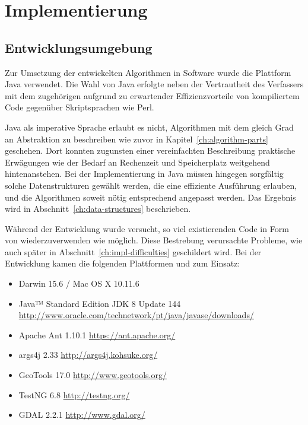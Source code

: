 \documentclass[../main/thesis.tex]{subfiles}
\begin{document}
\chapter{Implementierung}

\section{Entwicklungsumgebung}

Zur Umsetzung der entwickelten Algorithmen in Software wurde die Plattform Java verwendet.
Die Wahl von Java erfolgte neben der Vertrautheit des Verfassers mit dem zugehörigen  aufgrund zu erwartender Effizienzvorteile von kompiliertem Code gegenüber Skriptsprachen wie Perl.

Java als imperative Sprache erlaubt es nicht, Algorithmen mit dem gleich Grad an Abstraktion zu beschreiben wie zuvor in Kapitel~\ref{ch:algorithm-parts} geschehen.
Dort konnten zugunsten einer vereinfachten
Beschreibung praktische Erwägungen wie der Bedarf an Rechenzeit und Speicherplatz weitgehend hintenanstehen.
Bei der Implementierung in Java müssen hingegen sorgfältig solche Datenstrukturen gewählt werden, die eine effiziente Ausführung erlauben, und die Algorithmen soweit nötig entsprechend angepasst werden.
Das Ergebnis wird in Abschnitt~\ref{ch:data-structures} beschrieben.

Während der Entwicklung wurde versucht, so viel existierenden Code in Form von  wiederzuverwenden wie möglich.
Diese Bestrebung verursachte Probleme, wie auch später in Abschnitt~\ref{ch:impl-difficulties} geschildert wird.
Bei der Entwicklung kamen die folgenden Plattformen und  zum Einsatz:

\begin{itemize}[nosep]
	\item Darwin 15.6 / Mac OS X 10.11.6
	\item Java™ Standard Edition JDK 8 Update 144\\ \url{http://www.oracle.com/technetwork/pt/java/javase/downloads/}
	\item Apache Ant 1.10.1 \quad \url{https://ant.apache.org/}
	\item args4j 2.33 \quad \url{http://args4j.kohsuke.org/}
	\item GeoTools 17.0 \quad \url{http://www.geotools.org/}
	\item TestNG 6.8 \quad \url{http://testng.org/}
	\item GDAL 2.2.1 \quad \url{http://www.gdal.org/}
\end{itemize}
\end{document}

